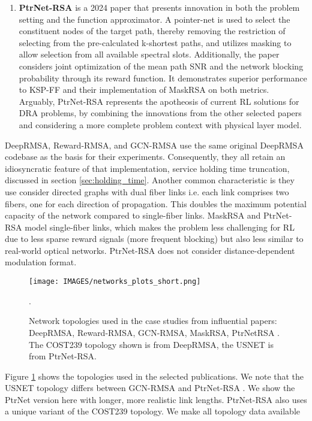 \begin{enumerate}
    \item \textbf{PtrNet-RSA} \cite{cheng_ptrnet-rsa_2024} is a 2024 paper that presents innovation in both the problem setting and the function approximator. A pointer-net \cite{vinyals_pointer_2015} is used to select the constituent nodes of the target path, thereby removing the restriction of selecting from the pre-calculated k-shortest paths, and utilizes masking to allow selection from all available spectral slots. Additionally, the paper considers joint optimization of the mean path SNR and the network blocking probability through its reward function. It demonstrates superior performance to KSP-FF and their implementation of MaskRSA on both metrics. Arguably, PtrNet-RSA represents the apotheosis of current RL solutions for DRA problems, by combining the innovations from the other selected papers and considering a more complete problem context with physical layer model.
\end{enumerate}

DeepRMSA, Reward-RMSA, and GCN-RMSA use the same original DeepRMSA codebase as the basis for their experiments. Consequently, they all retain an idiosyncratic feature of that implementation, service holding time truncation, discussed in section \ref{sec:holding_time}. Another common characteristic is they use consider directed graphs with dual fiber links i.e. each link comprises two fibers, one for each direction of propagation. This doubles the maximum potential capacity of the network compared to single-fiber links. MaskRSA and PtrNet-RSA model single-fiber links, which makes the problem less challenging for RL due to less sparse reward signals (more frequent blocking) but also less similar to real-world optical networks. PtrNet-RSA does not consider distance-dependent modulation format.


\begin{figure}
  \texttt{[image: IMAGES/networks\_plots\_short.png]}
  \caption{Network topologies used in the case studies from influential papers: DeepRMSA, Reward-RMSA, GCN-RMSA, MaskRSA, PtrNetRSA \cite{chen_deeprmsa_2019} \cite{tang_heuristic_2022} \cite{xu_deep_2022} \cite{shimoda_mask_2021} \cite{cheng_ptrnet-rsa_2024}. The COST239 topology shown is from DeepRMSA, the USNET is from PtrNet-RSA.}
  \label{fig:network_plots}.
\end{figure}

Figure \ref{fig:network_plots} shows the topologies used in the selected publications. %
We note that the USNET topology differs between GCN-RMSA \cite{xu_deep_2022} and PtrNet-RSA \cite{cheng_ptrnet-rsa_2024}. We show the PtrNet version here with longer, more realistic link lengths. PtrNet-RSA also uses a unique variant of the COST239 topology. We make all topology data available \cite{micdoh_xlron_2024}






